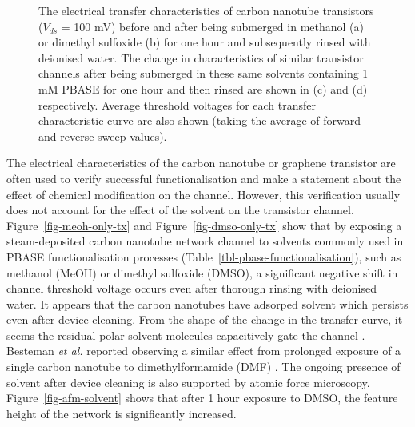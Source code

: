 \documentclass[
  a4paper,
]{scrbook}
\begin{document}
\begin{figure}
\begin{minipage}[t]{0.50\linewidth}
{{}

}

\subcaption{\label{fig-dmso-pbase-tx}}
\end{minipage}%

\caption{\label{fig-PBASE-vs-solvent-only}The electrical transfer
characteristics of carbon nanotube transistors (\(V_{ds}\) = 100 mV)
before and after being submerged in methanol (a) or dimethyl sulfoxide
(b) for one hour and subsequently rinsed with deionised water. The
change in characteristics of similar transistor channels after being
submerged in these same solvents containing 1 mM PBASE for one hour and
then rinsed are shown in (c) and (d) respectively. Average threshold
voltages for each transfer characteristic curve are also shown (taking
the average of forward and reverse sweep values).}

\end{figure}

The electrical characteristics of the carbon nanotube or graphene
transistor are often used to verify successful functionalisation and
make a statement about the effect of chemical modification on the
channel. However, this verification usually does not account for the
effect of the solvent on the transistor channel.
Figure~\ref{fig-meoh-only-tx} and Figure~\ref{fig-dmso-only-tx} show
that by exposing a steam-deposited carbon nanotube network channel to
solvents commonly used in PBASE functionalisation processes
(Table~\ref{tbl-pbase-functionalisation}), such as methanol (MeOH) or
dimethyl sulfoxide (DMSO), a significant negative shift in channel
threshold voltage occurs even after thorough rinsing with deionised
water. It appears that the carbon nanotubes have adsorped solvent which
persists even after device cleaning. From the shape of the change in the
transfer curve, it seems the residual polar solvent molecules
capacitively gate the channel \autocite{Artyukhin2006,Heller2008}.
Besteman \emph{et al.} reported observing a similar effect from
prolonged exposure of a single carbon nanotube to dimethylformamide
(DMF) \autocite{Besteman2003}. The ongoing presence of solvent after
device cleaning is also supported by atomic force microscopy.
Figure~\ref{fig-afm-solvent} shows that after 1 hour exposure to DMSO,
the feature height of the network is significantly increased.
\end{document}
